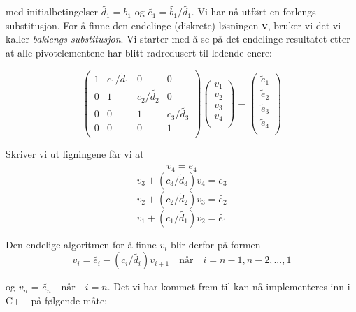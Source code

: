 \documentclass{article}
\begin{document}
med initialbetingelser $\tilde{d_1} = b_1$ og $\tilde{e_1} = \tilde{b_1}/\tilde{d_1}$. Vi har nå utført en forlengs substitusjon. For å finne den endelinge (diskrete) løsningen \textbf{v}, bruker vi det vi kaller \textit{baklengs substitusjon}. Vi starter med å se på det endelinge resultatet etter at alle pivotelementene har blitt radredusert til ledende enere:

\begin{equation}
    \left(\begin{array}{cccccc}
                           1 & c_1/\tilde{d_1} & 0 &0 \\
                           0 & 1 & c_2/\tilde{d_2} &0 \\
                           0 & 0 & 1 & c_3/\tilde{d_3} \\
                           0 & 0 & 0 &  1  \\
                      \end{array} \right)\left(\begin{array}{c}
                           v_1\\
                           v_2\\
                           v_3\\
                          v_4  \\
                      \end{array} \right)
  =\left(\begin{array}{c}
                           \tilde{e}_1\\
                           \tilde{e}_2\\
                        \tilde{e}_3\\
                        \tilde{e}_4\\
                      \end{array} \right)
\end{equation}

Skriver vi ut ligningene får vi at
\[v_4 = \tilde{e_4}\]
\[v_3 + (c_3/\tilde{d_3})v_4 = \tilde{e_3} \]
\[v_2 + (c_2/\tilde{d_2})v_3 = \tilde{e_2}\]
\[v_1 + (c_1/\tilde{d_1})v_2 = \tilde{e_1}\]

Den endelige algoritmen for å finne $v_i$ blir derfor på formen
\begin{equation}
v_i = \tilde{e_i}-(c_{i}/\tilde{d_i})v_{i+1} \quad \textrm{når} \quad i = n-1, n-2, ..., 1
\end{equation}

og $v_n$ = $\tilde{e_n} \quad \textrm{når} \quad i = n$. Det vi har kommet frem til kan nå implementeres inn i C++ på følgende måte:
\end{document}
